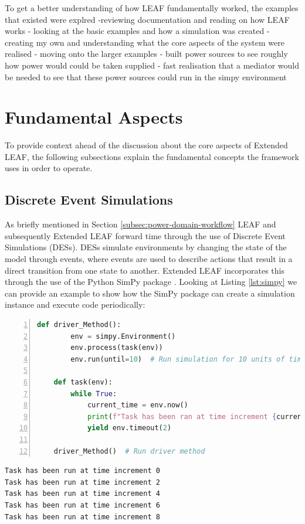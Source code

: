 \documentclass{l4proj}
\begin{document}
To get a better understanding of how LEAF fundamentally worked, the examples that existed were explred
-reviewing documentation and reading on how LEAF works
- looking at the basic examples and how a simulation was created
- creating my own and understanding what the core aspects of the system were realised
- moving onto the larger examples
- built power sources to see roughly how power would could be taken supplied
- fast realisation that a mediator would be needed to see that these power sources could run in the simpy environment

\section{Fundamental Aspects}\label{imp:sec:time-data}
To provide context ahead of the discussion about the core aspects of Extended LEAF, the following subsections explain the fundamental concepts the framework uses in order to operate.

\subsection{Discrete Event Simulations}\label{imp:subsec:des}
As briefly mentioned in Section \ref{subsec:power-domain-workflow} LEAF and subsequently Extended LEAF forward time through the use of Discrete Event Simulations (DESs).
DESs simulate environments by changing the state of the model through events, where events are used to describe actions that result in a direct transition from one state to another.
Extended LEAF incorporates this through the use of the Python SimPy package \cite{simpy}.
Looking at Listing \ref{lst:simpy} we can provide an example to show how the SimPy package can create a simulation instance and execute code periodically:
\begin{lstlisting}[language=python, numbers=left, caption={Example use of the SimPy environment}, label=lst:simpy]
    def driver_Method():
        env = simpy.Environment()
        env.process(task(env))
        env.run(until=10)  # Run simulation for 10 units of time

    def task(env):
        while True:
            current_time = env.now()
            print(f"Task has been ran at time increment {current_time}")
            yield env.timeout(2)

    driver_Method()  # Run driver method
\end{lstlisting}
\begin{lstlisting}[language=TeX, caption={Terminal output of Listing \ref{lst:simpy}}, label=lst:simpy-output]
Task has been run at time increment 0
Task has been run at time increment 2
Task has been run at time increment 4
Task has been run at time increment 6
Task has been run at time increment 8
\end{lstlisting}
\end{document}

